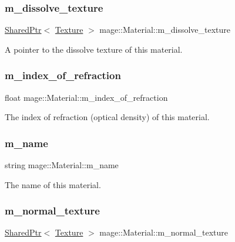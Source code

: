 \subsubsection{\texorpdfstring{m\+\_\+dissolve\+\_\+texture}{m\_dissolve\_texture}}
{\footnotesize\ttfamily \hyperlink{namespacemage_a1e01ae66713838a7a67d30e44c67703e}{Shared\+Ptr}$<$ \hyperlink{classmage_1_1_texture}{Texture} $>$ mage\+::\+Material\+::m\+\_\+dissolve\+\_\+texture}

A pointer to the dissolve texture of this material. \hypertarget{structmage_1_1_material_a8b584541ab8bfc527f856c68bb0152e7}{}\label{structmage_1_1_material_a8b584541ab8bfc527f856c68bb0152e7} 
\subsubsection{\texorpdfstring{m\+\_\+index\+\_\+of\+\_\+refraction}{m\_index\_of\_refraction}}
{\footnotesize\ttfamily float mage\+::\+Material\+::m\+\_\+index\+\_\+of\+\_\+refraction}

The index of refraction (optical density) of this material. \hypertarget{structmage_1_1_material_a2b3e839a8ae093d53b12529d61ec6605}{}\label{structmage_1_1_material_a2b3e839a8ae093d53b12529d61ec6605} 
\subsubsection{\texorpdfstring{m\+\_\+name}{m\_name}}
{\footnotesize\ttfamily string mage\+::\+Material\+::m\+\_\+name}

The name of this material. \hypertarget{structmage_1_1_material_a18e56785d5ca3ae5a9b99c64e70622d6}{}\label{structmage_1_1_material_a18e56785d5ca3ae5a9b99c64e70622d6} 
\subsubsection{\texorpdfstring{m\+\_\+normal\+\_\+texture}{m\_normal\_texture}}
{\footnotesize\ttfamily \hyperlink{namespacemage_a1e01ae66713838a7a67d30e44c67703e}{Shared\+Ptr}$<$ \hyperlink{classmage_1_1_texture}{Texture} $>$ mage\+::\+Material\+::m\+\_\+normal\+\_\+texture}

